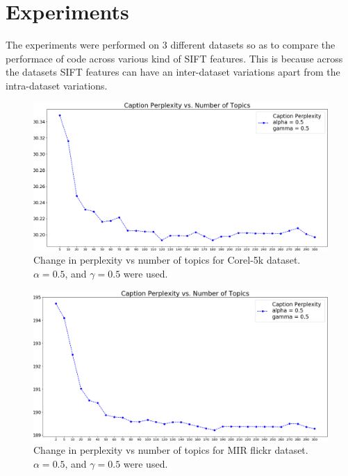 \documentclass[journal]{IEEEtran}
\begin{document}
\section{Experiments}
The experiments were performed on 3 different datasets so as to compare the performace of code across various kind of SIFT features. This is because across the datasets SIFT features can have an inter-dataset variations apart from the intra-dataset variations. 

\begin{figure}
    \centering
    \includegraphics[width=\columnwidth]{images/data1_alpha_05_gamma_05.png}
    \caption{Change in perplexity vs number of topics for Corel-5k dataset. $\alpha = 0.5 $, and $\gamma = 0.5$ were used.}
    \label{fig:c5k}
\end{figure}


\begin{figure}
    \centering
    \includegraphics[width=\columnwidth]{images/data2_alpha_05_gamma_05.png}
    \caption{Change in perplexity vs number of topics for MIR flickr dataset. $\alpha = 0.5 $, and $\gamma = 0.5$ were used.}
    \label{fig:mirflickr}
\end{figure}
\end{document}
